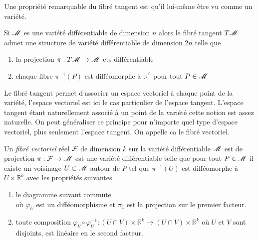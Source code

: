 \documentclass[a4paper,11pt]{report}
\begin{document}
                Une propriété remarquable du fibré tangent est qu'il lui-même être vu comme un variété.
                
                \begin{prop}\begin{leftbar}
                    Si $\mathscr{M}$ es une variété différentiable de dimension $n$ alors le fibré tangent $T\mathscr{M}$ admet une structure de variété différentiable de dimension $2n$ telle que
                    \begin{enumerate}[label = \textit{\roman*)}]
                        \item la projection $\pi:T\mathscr{M}\to\mathscr{M}$ ets différentiable
                        \item chaque fibre $\pi^{-1}(P)$ est difféomorphe à $\mathbb{R^{n}}$ pour tout $P\in\mathscr{M}$
                    \end{enumerate}
                \end{leftbar}\end{prop}
                
                Le fibré tangent permet d'associer un espace vectoriel à chaque point de la variété, l'espace vectoriel est ici le cas particulier de l'espace tangent. L'espace tangent étant naturellement associé à un point de la variété cette notion est assez naturelle. On peut généraliser ce principe pour n'importe quel type d'espace vectoriel, plus seulement l'espace tangent. On appelle ca le fibré vectoriel.
                
                \begin{defn}
                    Un \textit{fibré vectoriel} réel $\mathcal{F}$ de dimension $k$ sur la variété différentiable $\mathscr{M}$ est de projection $\pi:\mathcal{F}\to\mathscr{M}$ est une variété différentiable telle que pour tout $P\in\mathscr{M}$ il existe un voisinage $U\subset\mathscr{M}$ autour de $P$ tel que $\pi^{-1}(U)$ est difféomorphe à $U\times \mathbb{R}^k$ avec les propriétés suivantes
                    \begin{enumerate}[label = \textit{\roman*)}]
                        \item le diagramme suivant commute\\
                        où $\varphi_U$ est un difféomorphisme et $\pi_1$ est la projection sur le premier facteur.
                        \item toute composition $\varphi_V\circ\varphi_U^{-1} : (U\cap V)\times \mathbb{R}^k\to (U\cap V)\times \mathbb{R}^k$ où $U$ et $V$ sont disjoints, est linéaire en le second facteur.
                    \end{enumerate}
                \end{defn}
                
\end{document}
